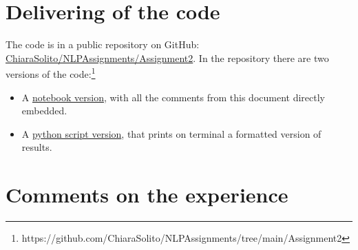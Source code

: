 \documentclass{article}
\begin{document}
    \section{Delivering of the code}
    The code is in a public repository on GitHub:\\
    \href{https://github.com/ChiaraSolito/NLPAssignments/tree/main/Assignment2}{ChiaraSolito/NLPAssignments/Assignment2}. In the repository there are two versions of the code:\footnote{https://github.com/ChiaraSolito/NLPAssignments/tree/main/Assignment2}
        \begin{itemize}
            \item A \href{https://github.com/ChiaraSolito/NLPAssignments/blob/main/Assignment1/secondtAssignment.ipynb}{notebook version}, with all the comments from this document directly embedded.
            \item A \href{https://github.com/ChiaraSolito/NLPAssignments/blob/main/Assignment1/secondAssignment.py}{python script version}, that prints on terminal a formatted version of results.
        \end{itemize}

    \section{Comments on the experience}
\end{document}
